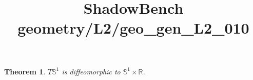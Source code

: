 \documentclass{article}
\title{ShadowBench geometry/L2/geo\_gen\_L2\_010}
\newtheorem{theorem}{Theorem}
\begin{document}
\maketitle

\begin{theorem}
$T\mathbb{S}^1$ is diffeomorphic to $\mathbb{S}^1 \times \mathbb{R}$.
\end{theorem}
\end{document}
